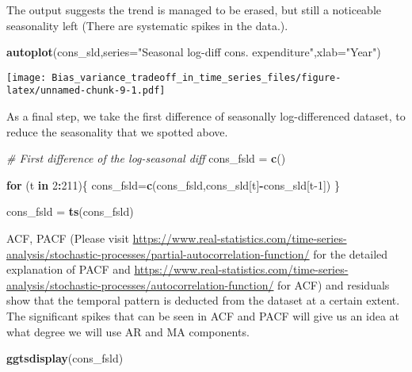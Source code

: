 \documentclass[
]{article}
\newenvironment{Shaded}{\begin{snugshade}}{\end{snugshade}}
\newcommand{\CommentTok}[1]{\textcolor[rgb]{0.56,0.35,0.01}{\textit{#1}}}
\newcommand{\ControlFlowTok}[1]{\textcolor[rgb]{0.13,0.29,0.53}{\textbf{#1}}}
\newcommand{\DataTypeTok}[1]{\textcolor[rgb]{0.13,0.29,0.53}{#1}}
\newcommand{\DecValTok}[1]{\textcolor[rgb]{0.00,0.00,0.81}{#1}}
\newcommand{\KeywordTok}[1]{\textcolor[rgb]{0.13,0.29,0.53}{\textbf{#1}}}
\newcommand{\NormalTok}[1]{#1}
\newcommand{\OperatorTok}[1]{\textcolor[rgb]{0.81,0.36,0.00}{\textbf{#1}}}
\newcommand{\StringTok}[1]{\textcolor[rgb]{0.31,0.60,0.02}{#1}}
\begin{document}
The output suggests the trend is managed to be erased, but still a
noticeable seasonality left (There are systematic spikes in the data.).

\begin{Shaded}
\begin{Highlighting}[]
\KeywordTok{autoplot}\NormalTok{(cons_sld,}\DataTypeTok{series=}\StringTok{"Seasonal log-diff cons. expenditure"}\NormalTok{,}\DataTypeTok{xlab=}\StringTok{"Year"}\NormalTok{)}
\end{Highlighting}
\end{Shaded}

\texttt{[image: Bias\_variance\_tradeoff\_in\_time\_series\_files/figure-latex/unnamed-chunk-9-1.pdf]}

As a final step, we take the first difference of seasonally
log-differenced dataset, to reduce the seasonality that we spotted
above.

\begin{Shaded}
\begin{Highlighting}[]
\CommentTok{# First difference of the log-seasonal diff}
\NormalTok{cons_fsld =}\StringTok{ }\KeywordTok{c}\NormalTok{()}

\ControlFlowTok{for}\NormalTok{ (t }\ControlFlowTok{in} \DecValTok{2}\OperatorTok{:}\DecValTok{211}\NormalTok{)\{}
\NormalTok{  cons_fsld=}\KeywordTok{c}\NormalTok{(cons_fsld,cons_sld[t]}\OperatorTok{-}\NormalTok{cons_sld[t}\DecValTok{-1}\NormalTok{])}
\NormalTok{\}}

\NormalTok{cons_fsld =}\StringTok{ }\KeywordTok{ts}\NormalTok{(cons_fsld)}
\end{Highlighting}
\end{Shaded}

ACF, PACF (Please visit
\url{https://www.real-statistics.com/time-series-analysis/stochastic-processes/partial-autocorrelation-function/}
for the detailed explanation of PACF and
\url{https://www.real-statistics.com/time-series-analysis/stochastic-processes/autocorrelation-function/}
for ACF) and residuals show that the temporal pattern is deducted from
the dataset at a certain extent. The significant spikes that can be seen
in ACF and PACF will give us an idea at what degree we will use AR and
MA components.

\begin{Shaded}
\begin{Highlighting}[]
\KeywordTok{ggtsdisplay}\NormalTok{(cons_fsld)}
\end{Highlighting}
\end{Shaded}
\end{document}
